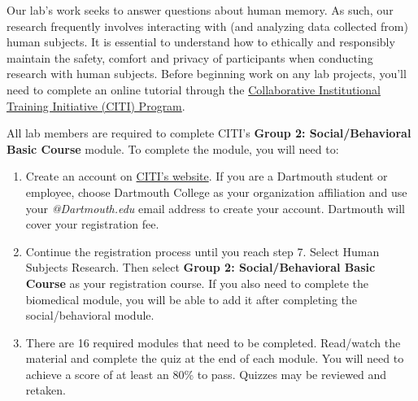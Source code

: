 \documentclass{tufte-book} %
\begin{document}

\noindent Our lab's work seeks to answer questions about human memory.
As such, our research frequently involves interacting with (and
analyzing data collected from) human subjects. It is essential to
understand how to ethically and responsibly maintain the safety,
comfort and privacy of participants when conducting research with
human subjects. Before beginning work on any lab projects, you'll need
to complete an online tutorial through the
\href{https://about.citiprogram.org} {Collaborative Institutional
  Training Initiative (CITI) Program}.

\noindent All lab members are required to complete CITI's
\textbf{Group 2: Social/Behavioral Basic Course} module.  To complete
the module, you will need to:
\begin{enumerate}
\item Create an account on \href{https://about.citiprogram.org}{CITI's
    website}.  If you are a Dartmouth student or employee, choose
  Dartmouth College as your organization affiliation and use your
  \textit{@Dartmouth.edu} email address to create your account.
  Dartmouth will cover your registration fee.
\item Continue the registration process until you reach step 7. Select
  Human Subjects Research. Then select \textbf{Group 2:
    Social/Behavioral Basic Course} as your registration course.  If
  you also need to complete the biomedical module, you will be able to
  add it after completing the social/behavioral module.
\item There are 16 required modules that need to be
  completed. Read/watch the material and complete the quiz at the
  end of each module. You will need to achieve a score of at least an
  80\% to pass. Quizzes may be reviewed and retaken.
\end{enumerate}
\end{document}
